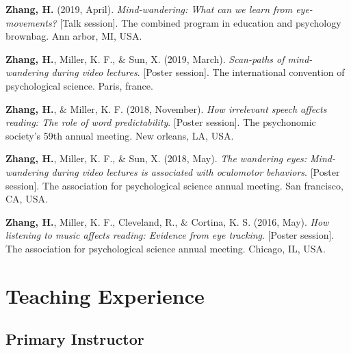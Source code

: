 \documentclass[11pt,a4paper,]{awesome-cv}
\begin{document}
\leavevmode{}%
\textbf{Zhang, H.} (2019, April). \emph{Mind-wandering: What can we
learn from eye-movements?} {[}Talk session{]}. The combined program in
education and psychology brownbag. Ann arbor, MI, USA.

\leavevmode{}%
\textbf{Zhang, H.}, Miller, K. F., \& Sun, X. (2019, March).
\emph{Scan-paths of mind-wandering during video lectures}. {[}Poster
session{]}. The international convention of psychological science.
Paris, france.

\leavevmode{}%
\textbf{Zhang, H.}, \& Miller, K. F. (2018, November). \emph{How
irrelevant speech affects reading: The role of word predictability}.
{[}Poster session{]}. The psychonomic society's 59th annual meeting. New
orleans, LA, USA.

\leavevmode{}%
\textbf{Zhang, H.}, Miller, K. F., \& Sun, X. (2018, May). \emph{The
wandering eyes: Mind-wandering during video lectures is associated with
oculomotor behaviors}. {[}Poster session{]}. The association for
psychological science annual meeting. San francisco, CA, USA.

\leavevmode{}%
\textbf{Zhang, H.}, Miller, K. F., Cleveland, R., \& Cortina, K. S.
(2016, May). \emph{How listening to music affects reading: Evidence from
eye tracking}. {[}Poster session{]}. The association for psychological
science annual meeting. Chicago, IL, USA.

\hypertarget{teaching-experience}{%
\section{Teaching Experience}\label{teaching-experience}}

\hypertarget{primary-instructor}{%
\subsection{Primary Instructor}\label{primary-instructor}}

\begin{cventries}
    \vspace{-4.0mm}
\end{cventries}
\end{document}
